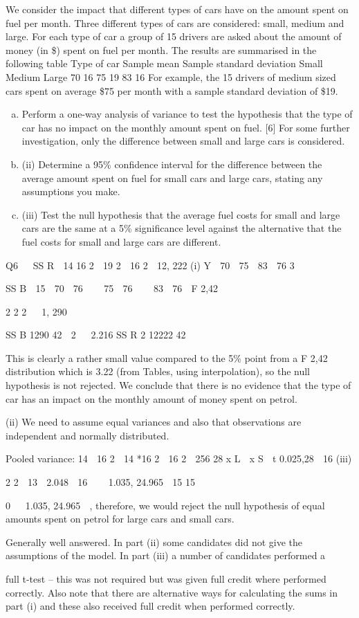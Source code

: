 \documentclass[a4paper,12pt]{article}
\begin{document}
\item We consider the impact that different types of cars have on the amount spent on fuel
per month. Three different types of cars are considered: small, medium and large.
For each type of car a group of 15 drivers are asked about the amount of money (in \$)
spent on fuel per month. The results are summarised in the following table
Type of car
Sample mean
Sample standard deviation
Small Medium Large
70
16
75
19
83
16
For example, the 15 drivers of medium sized cars spent on average \$75 per month
with a sample standard deviation of \$19.

\begin{enumerate}[(a)]
\item %
Perform a one-way analysis of variance to test the hypothesis that the type of
car has no impact on the monthly amount spent on fuel.
[6]
For some further investigation, only the difference between small and large cars is
considered.
\item (ii) Determine a 95\% confidence interval for the difference between the average
amount spent on fuel for small cars and large cars, stating any assumptions
you make.
\item 
(iii) Test the null hypothesis that the average fuel costs for small and large cars are
the same at a 5\% significance level against the alternative that the fuel costs
for small and large cars are different.
\end{enumerate}
\newpage
Q6


SS R  14 16 2  19 2  16 2  12, 222
(i)
Y 
70  75  83
 76
3


SS B  15  70  76    75  76    83  76 
F 2,42

2
2
2
  1, 290

SS B
1290 42
 2 
 2.216
SS R
2 12222
42

This is clearly a rather small value compared to the 5\% point from a F 2,42 distribution which is 3.22 (from Tables, using interpolation), so the null hypothesis is not rejected. We conclude that there is no evidence that the type
of car has an impact on the monthly amount of money spent on petrol.

(ii)
We need to assume equal variances and also that observations are independent
and normally distributed.

Pooled variance:
14  16 2  14 *16 2
 16 2  256
28
x L  x S  t 0.025,28  16
(iii)

2
2
 13  2.048  16 
  1.035, 24.965 
15
15

0   1.035, 24.965  , therefore, we would reject the null hypothesis of equal amounts spent on petrol for large cars and small cars.


Generally well answered. In part (ii) some candidates did not give the assumptions of the model. In part (iii) a number of candidates performed a

full t-test – this was not required but was given full credit where performed correctly. Also note that there are alternative ways for calculating the sums in part (i) and these also received full credit when performed correctly.

\end{document}
